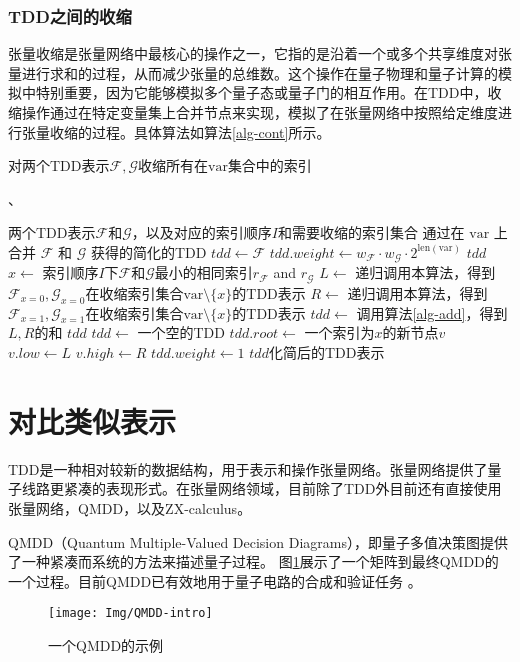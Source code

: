 \subsubsection*{TDD之间的收缩}
张量收缩是张量网络中最核心的操作之一，它指的是沿着一个或多个共享维度对张量进行求和的过程，从而减少张量的总维数。这个操作在量子物理和量子计算的模拟中特别重要，因为它能够模拟多个量子态或量子门的相互作用。在TDD中，收缩操作通过在特定变量集上合并节点来实现，模拟了在张量网络中按照给定维度进行张量收缩的过程。具体算法如算法\ref{alg-cont}所示。
\begin{algorithm}
\caption{对两个TDD表示\(\mathcal{F}, \mathcal{G}\)收缩所有在\(\text{var}\)集合中的索引}、
\label{alg-cont}
\begin{algorithmic}[1]
\Require 两个TDD表示\(\mathcal{F}\)和\(\mathcal{G}\)，以及对应的索引顺序\(I\)和需要收缩的索引集合
\Ensure 通过在 $\text{var}$ 上合并 \(\mathcal{F}\) 和 \(\mathcal{G}\) 获得的简化的TDD
    \State \(tdd \gets \mathcal{F}\)
    \State \(tdd.weight \gets w_{\mathcal{F}} \cdot w_{\mathcal{G}} \cdot 2^{\text{len}(\text{var})}\)
    \State \Return \(tdd\)
\EndIf
\State \(x \gets\) 索引顺序\(I\)下\(\mathcal{F}\)和\(\mathcal{G}\)最小的相同索引\(r_{\mathcal{F}}\) and \(r_{\mathcal{G}}\)
\State \(L \gets \) 递归调用本算法，得到\(\mathcal{F}_{x=0}, \mathcal{G}_{x=0}\)在收缩索引集合\(\text{var}\setminus\{x\}\)的TDD表示
\State \(R \gets \) 递归调用本算法，得到\(\mathcal{F}_{x=1}, \mathcal{G}_{x=1}\)在收缩索引集合\(\text{var}\setminus\{x\}\)的TDD表示
    \State \(tdd \gets\) 调用算法\ref{alg-add}，得到\(L, R\)的和
    \State \Return $tdd$
\Else
    \State \(tdd \gets\) 一个空的TDD
    \State \(tdd.root \gets\) 一个索引为\(x\)的新节点\(v\)
    \State \(v.low \gets L\)
    \State \(v.high \gets R\)
    \State \(tdd.weight \gets 1\)
    \State \Return \(tdd\)化简后的TDD表示
\EndIf
\end{algorithmic}
\end{algorithm}

\section{对比类似表示}
TDD是一种相对较新的数据结构，用于表示和操作张量网络。张量网络提供了量子线路更紧凑的表现形式。在张量网络领域，目前除了TDD外目前还有直接使用张量网络，QMDD\citep{1623982}，以及ZX-calculus\citep{van2020zx}。

QMDD（Quantum Multiple-Valued Decision Diagrams），即量子多值决策图提供了一种紧凑而系统的方法来描述量子过程。
图\ref{fig:qmdd-basic}展示了一个矩阵到最终QMDD的一个过程。目前QMDD已有效地用于量子电路的合成\citep{niemann2020advanced}和验证任务
\citep{burgholzer2020verifying,burgholzer2020advanced}。
\begin{figure}[!htbp]
    \centering
    \texttt{[image: Img/QMDD-intro]}
    \caption{一个QMDD的示例}
    \label{fig:qmdd-basic}
\end{figure}

